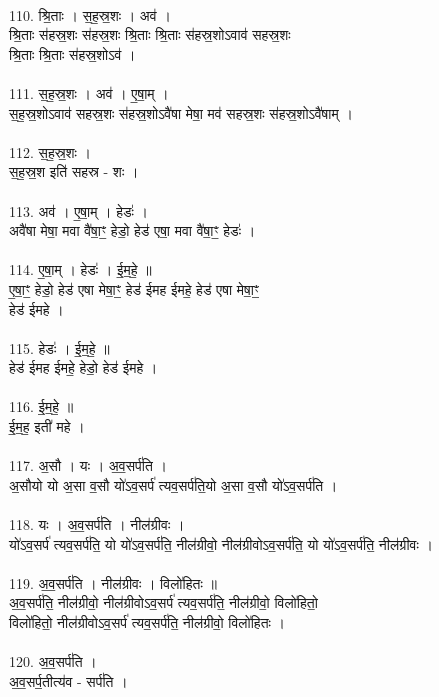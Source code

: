 \\
110. श्रि॒ताः । स॒ह॒स्र॒शः । अव॑ ।\\
श्रि॒ताः स॑हस्र॒शः स॑हस्र॒शः श्रि॒ताः श्रि॒ताः स॑हस्र॒शोऽवाव॑ सहस्र॒शः\\
श्रि॒ताः श्रि॒ताः स॑हस्र॒शोऽव॑ ।\\
\\
111. स॒ह॒स्र॒शः । अव॑ । ए॒षा॒म् ।\\
स॒ह॒स्र॒शोऽवाव॑ सहस्र॒शः स॑हस्र॒शोऽवै॑षा मेषा॒ मव॑ सहस्र॒शः स॑हस्र॒शोऽवै॑षाम् ।\\
\\
112. स॒ह॒स्र॒शः ।\\
स॒ह॒स्र॒श इति॑ सहस्र - शः ।\\
\\
113. अव॑ । ए॒षा॒म् । हेडः॑ ।\\
अवै॑षा मेषा॒ मवा वै॑षा॒ꣳ॒ हेडो॒ हेड॑ एषा॒ मवा वै॑षा॒ꣳ॒ हेडः॑ ।\\
\\
114. ए॒षा॒म् । हेडः॑ । ई॒म॒हे॒ ॥\\
ए॒षा॒ꣳ॒ हेडो॒ हेड॑ एषा मेषा॒ꣳ॒ हेड॑ ईमह ईमहे॒ हेड॑ एषा मेषा॒ꣳ॒\\
हेड॑ ईमहे ।\\
\\
115. हेडः॑ । ई॒म॒हे॒ ॥\\
हेड॑ ईमह ईमहे॒ हेडो॒ हेड॑ ईमहे ।\\
\\
116. ई॒म॒हे॒ ॥\\
ई॒म॒ह॒ इती॑ महे ।\\
\\
117. अ॒सौ । यः । अ॒व॒सर्प॑ति ।\\
अ॒सौयो यो अ॒सा व॒सौ यो॑ऽव॒सर्प॑ त्यव॒सर्प॑ति॒यो अ॒सा व॒सौ यो॑ऽव॒सर्प॑ति ।\\
\\
118. यः । अ॒व॒सर्प॑ति । नील॑ग्रीवः ।\\
यो॑ऽव॒सर्प॑ त्यव॒सर्प॑ति॒ यो यो॑ऽव॒सर्प॑ति॒ नील॑ग्रीवो॒ नील॑ग्रीवोऽव॒सर्प॑ति॒ यो यो॑ऽव॒सर्प॑ति॒ नील॑ग्रीवः ।\\
\\
119. अ॒व॒सर्प॑ति । नील॑ग्रीवः । विलो॑हितः ॥\\
अ॒व॒सर्प॑ति॒ नील॑ग्रीवो॒ नील॑ग्रीवोऽव॒सर्प॑ त्यव॒सर्प॑ति॒ नील॑ग्रीवो॒ विलो॑हितो॒\\
विलो॑हितो॒ नील॑ग्रीवोऽव॒सर्प॑ त्यव॒सर्प॑ति॒ नील॑ग्रीवो॒ विलो॑हितः ।\\
\\
120. अ॒व॒सर्प॑ति ।\\
अ॒व॒सर्प॒तीत्य॑व - सर्प॑ति ।\\
